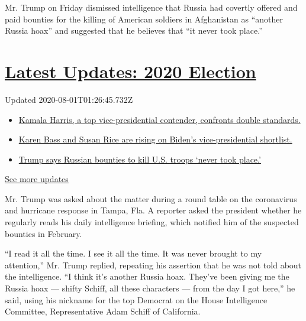 Mr. Trump on Friday dismissed intelligence that Russia had covertly
offered and paid bounties for the killing of American soldiers in
Afghanistan as ``another Russia hoax'' and suggested that he believes
that ``it never took place.''

\hypertarget{latest-updates-2020-election}{%
\section{\texorpdfstring{\href{https://www.nytimes.com/2020/07/31/us/elections/biden-vs-trump.html?action=click\&pgtype=Article\&state=default\&region=MAIN_CONTENT_1\&context=storylines_live_updates}{Latest
Updates: 2020
Election}}{Latest Updates: 2020 Election}}\label{latest-updates-2020-election}}

Updated 2020-08-01T01:26:45.732Z

\begin{itemize}
\tightlist
\item
  \href{https://www.nytimes.com/2020/07/31/us/elections/biden-vs-trump.html?action=click\&pgtype=Article\&state=default\&region=MAIN_CONTENT_1\&context=storylines_live_updates\#link-29fdff45}{Kamala
  Harris, a top vice-presidential contender, confronts double
  standards.}
\item
  \href{https://www.nytimes.com/2020/07/31/us/elections/biden-vs-trump.html?action=click\&pgtype=Article\&state=default\&region=MAIN_CONTENT_1\&context=storylines_live_updates\#link-13ec3d9c}{Karen
  Bass and Susan Rice are rising on Biden's vice-presidential
  shortlist.}
\item
  \href{https://www.nytimes.com/2020/07/31/us/elections/biden-vs-trump.html?action=click\&pgtype=Article\&state=default\&region=MAIN_CONTENT_1\&context=storylines_live_updates\#link-49e9a016}{Trump
  says Russian bounties to kill U.S. troops `never took place.'}
\end{itemize}

\href{https://www.nytimes.com/2020/07/31/us/elections/biden-vs-trump.html?action=click\&pgtype=Article\&state=default\&region=MAIN_CONTENT_1\&context=storylines_live_updates}{See
more updates}

Mr. Trump was asked about the matter during a round table on the
coronavirus and hurricane response in Tampa, Fla. A reporter asked the
president whether he regularly reads his daily intelligence briefing,
which notified him of the suspected bounties in February.

``I read it all the time. I see it all the time. It was never brought to
my attention,'' Mr. Trump replied, repeating his assertion that he was
not told about the intelligence. ``I think it's another Russia hoax.
They've been giving me the Russia hoax --- shifty Schiff, all these
characters --- from the day I got here,'' he said, using his nickname
for the top Democrat on the House Intelligence Committee, Representative
Adam Schiff of California.

